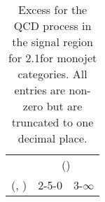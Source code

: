 \begin{table}[h!]
\tiny
\centering
\caption{Excess for the QCD process in the signal region for 2.1\ifb for monojet categories. All entries are non-zero but are truncated to one decimal place.\label{tab:excesssepnaive_sig_qcd_mono}}
\begin{tabular}
{ccc}
	\hline\hline
	& \multicolumn{2}{c}{\scalht (\gev)} \\ 
	 (\njet,  \nb) & 2-5-0 & 3-$\infty$ \\ [0.8ex] 
\hline
	\hline
	\hline
\end{tabular}
\end{table}
